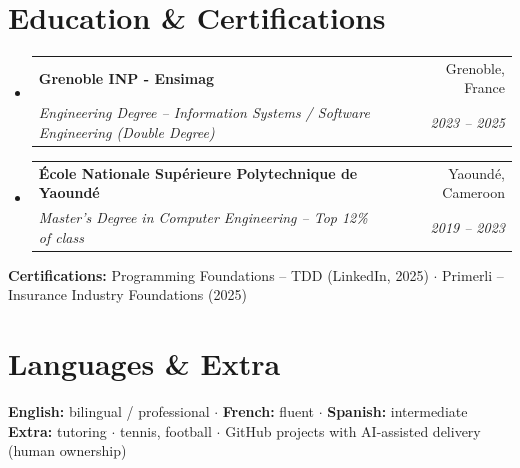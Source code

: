 \documentclass[letterpaper,10.5pt]{article}
\makeatletter
\newcommand{\resumeSubheading}[4]{\vspace{-1pt}\item\begin{tabular*}{0.97\textwidth}[t]{l@{\extracolsep{\fill}}r}\textbf{#1} & #2 \\\textit{\small#3} & \textit{\small #4} \\\end{tabular*}\vspace{-5pt}}
\newcommand{\resumeSubHeadingListStart}{\begin{itemize}[leftmargin=0.15in, label={}]}
\newcommand{\resumeSubHeadingListEnd}{\end{itemize}}
\makeatother
\begin{document}
\section{Education \& Certifications}
\resumeSubHeadingListStart
  \resumeSubheading{Grenoble INP - Ensimag}{Grenoble, France}{Engineering Degree -- Information Systems / Software Engineering (Double Degree)}{2023 -- 2025}
  \resumeSubheading{\'Ecole Nationale Sup\'erieure Polytechnique de Yaound\'e}{Yaound\'e, Cameroon}{Master's Degree in Computer Engineering -- Top 12\% of class}{2019 -- 2023}
\resumeSubHeadingListEnd
\small{\textbf{Certifications:} Programming Foundations -- TDD (LinkedIn, 2025) $\cdot$ Primerli -- Insurance Industry Foundations (2025)}
\section{Languages \& Extra}
\small{\textbf{English:} bilingual / professional $\cdot$ \textbf{French:} fluent $\cdot$ \textbf{Spanish:} intermediate \\ \textbf{Extra:} tutoring $\cdot$ tennis, football $\cdot$ GitHub projects with AI-assisted delivery (human ownership)}
\end{document}
